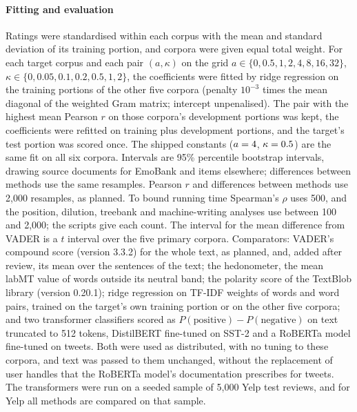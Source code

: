 \paragraph{Fitting and evaluation}
Ratings were standardised within each corpus with the mean and standard deviation of its training portion, and corpora were given equal total weight. For each target corpus and each pair $(a,\kappa)$ on the grid $a\in\{0,0.5,1,2,4,8,16,32\}$, $\kappa\in\{0,0.05,0.1,0.2,0.5,1,2\}$, the coefficients were fitted by ridge regression on the training portions of the other five corpora (penalty $10^{-3}$ times the mean diagonal of the weighted Gram matrix; intercept unpenalised). The pair with the highest mean Pearson $r$ on those corpora's development portions was kept, the coefficients were refitted on training plus development portions, and the target's test portion was scored once. The shipped constants ($a=4$, $\kappa=0.5$) are the same fit on all six corpora. Intervals are 95\% percentile bootstrap intervals, drawing source documents for EmoBank and items elsewhere; differences between methods use the same resamples. Pearson $r$ and differences between methods use 2,000 resamples, as planned. To bound running time Spearman's $\rho$ uses 500, and the position, dilution, treebank and machine-writing analyses use between 100 and 2,000; the scripts give each count. The interval for the mean difference from VADER is a $t$ interval over the five primary corpora. Comparators: VADER's compound score (version 3.3.2) for the whole text, as planned, and, added after review, its mean over the sentences of the text; the hedonometer, the mean labMT value of words outside its neutral band\cite{dodds2011}; the polarity score of the TextBlob library (version 0.20.1); ridge regression on TF-IDF weights of words and word pairs, trained on the target's own training portion or on the other five corpora; and two transformer classifiers scored as $P(\text{positive})-P(\text{negative})$ on text truncated to 512 tokens, DistilBERT fine-tuned on SST-2\cite{sanh2019} and a RoBERTa model fine-tuned on tweets\cite{loureiro2022}. Both were used as distributed, with no tuning to these corpora, and text was passed to them unchanged, without the replacement of user handles that the RoBERTa model's documentation prescribes for tweets. The transformers were run on a seeded sample of 5,000 Yelp test reviews, and for Yelp all methods are compared on that sample.

